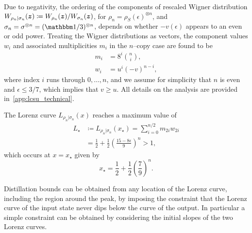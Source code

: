 \documentclass[pra,
aps,
twocolumn,
superscriptaddress,
groupedaddress,
nofootinbib,
reprint
]{revtex4-1}
\begin{document}
Due to negativity, the ordering of the components of rescaled Wigner distribution $W_{\rho_n |\sigma_n}(\bm{z}) \coloneqq W_{\rho_n}(\bm{z})/W_{\sigma_n}(\bm{z})$, for $\rho_n = \rho_S(\epsilon)^{\otimes n}$, and $\sigma_n = \sigma^{\otimes n}= (\I/3)^{\otimes n}$, depends on whether $-v(\epsilon)$ appears to an even or odd power. Treating the Wigner distributions as vectors, the component values $w_i$ and associated multiplicities $m_i$ in the $n$--copy case are found to be 
\begin{align}
	m_i &= 8^{i}\binom{n}{i}, \\
	w_i &= u^{i}(-v)^{n-i}, \label{eq:wigu}
\end{align}
where index $i$ runs through $0, \dots, n$, and we assume for simplicity that $n$ is even and $\epsilon \leq 3/7$, which implies that $v \geq u$.
All details on the analysis are provided in~\cref{app:lcsu_technical}.

The Lorenz curve $L_{\rho_n|\sigma_n}(x)$ reaches a maximum value of
\begin{align}\label{eq:lcsu_max}
	L_\star &\coloneqq L_{\rho_n |\sigma_n} (x_\star) = \sum_{i = 0}^{n/2} m_{2i} w_{2i} \nonumber\\
	&= \frac{1}{2} + \frac{1}{2}\left(\frac{15 - 8\epsilon}{9}\right)^n > 1,
\end{align}
which occurs at $x=x_\star$ given by
\begin{equation}
	x_\star = \frac{1}{2} + \frac{1}{2}\left(\frac{7}{9}\right)^n.
\end{equation}

Distillation bounds can be obtained from any location of the Lorenz curve, including the region around the peak, by imposing the constraint that the Lorenz curve of the input state never dips below the curve of the output. In particular a simple constraint can be obtained by considering the initial slopes of the two Lorenz curves. 
\end{document}
